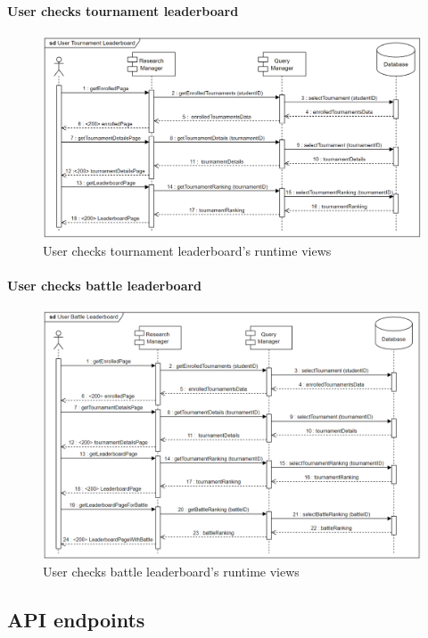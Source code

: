 \documentclass[12pt, a4paper]{report}
\begin{document}
    \paragraph*{User checks tournament leaderboard}
    \begin{figure}[H]
        \centering
        \includegraphics[width=1.0\linewidth]{images/utlrv.png}
        \caption{User checks tournament leaderboard's runtime views}
    \end{figure}

    \paragraph*{User checks battle leaderboard}
    \begin{figure}[H]
        \centering
        \includegraphics[width=1.0\linewidth]{images/ublrv.png}
        \caption{User checks battle leaderboard's runtime views}
    \end{figure}

    \subsection{API endpoints}
\end{document}
